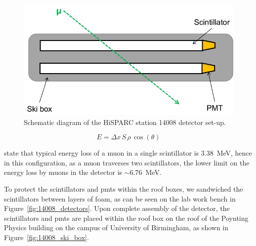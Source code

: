 \begin{figure}
	\center
	\includegraphics[width=0.5\columnwidth]{14008_config.png}
	\caption{Schematic diagram of the HiSPARC station 14008 detector set-up.}
	\label{fig:14008_config}
\end{figure}

\begin{equation}
E = \Delta x \, S \, \rho \, \cos(\theta)
\label{eq:energy_loss}
\end{equation}

\cite{bartels_hisparc_2012} state that typical energy loss of a muon in a single scintillator is $3.38$~MeV, hence in this configuration, as a muon traverses two scintillators, the lower limit on the energy loss by muons in the detector is $\sim 6.76$~MeV.

To protect the scintillators and \glspl{pmt} within the roof boxes, we sandwiched the scintillators between layers of foam, as can be seen on the lab work bench in Figure~\ref{fig:14008_detectors}. Upon complete assembly of the detector, the scintillators and \glspl{pmt} are placed within the roof box on the roof of the Poynting Physics building on the campus of University of Birmingham, as shown in Figure~\ref{fig:14008_ski_box}.

